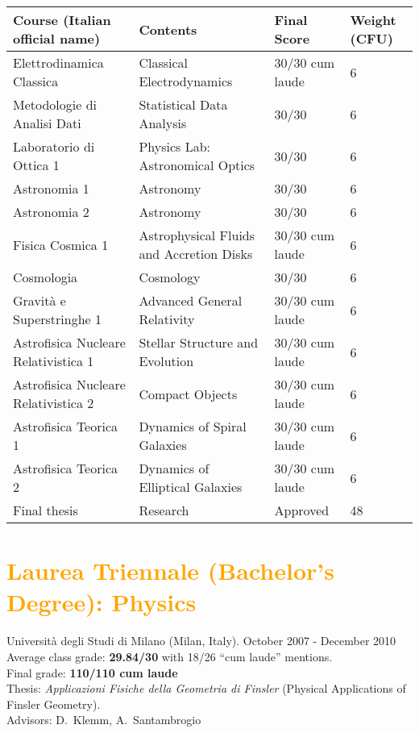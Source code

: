 \documentclass[a4paper,10pt,notitlepage]{paper}
\newcommand{\col}[1]{{\textcolor{Orange}{#1}}}
\begin{document}
{\begin{tabular*}{\linewidth}{l@{\hspace{0.65cm}}l@{\hspace{0.7cm}}l@{\hspace{0.7cm}}l@{\extracolsep{\fill}}}
\bf Course (Italian official name) & \bf Contents  & \bf Final Score &\bf Weight (CFU)\\
\hline \hline
Elettrodinamica Classica  					&  Classical Electrodynamics	 & 30/30 cum laude &   6 \\	
Metodologie di Analisi Dati				&  Statistical Data Analysis	&  30/30 &   6 \\
Laboratorio di Ottica 1					&  Physics Lab: Astronomical Optics & 30/30 &   6\\	
Astronomia 1 							&  Astronomy &  30/30&   6\\	
Astronomia 2							&  Astronomy &30/30 &   6 \\	
Fisica Cosmica	1						&  Astrophysical Fluids and Accretion Disks & 30/30 cum laude &   6\\	
Cosmologia  							&  Cosmology & 30/30&   6 \\	
Gravità e Superstringhe 1 					&  Advanced General Relativity & 30/30 cum laude &   6\\	
Astrofisica Nucleare Relativistica 1			&  Stellar Structure and Evolution & 30/30 cum laude&   6\\	
Astrofisica Nucleare Relativistica 2			&  Compact Objects  & 30/30 cum laude&   6\\
Astrofisica Teorica 1						&  Dynamics of Spiral Galaxies & 30/30 cum laude&   6\\	
Astrofisica Teorica 2						&  Dynamics of Elliptical Galaxies & 30/30 cum laude &   6\\
Final thesis						& Research  & Approved &  48\\
\end{tabular*}
}




\section*{\col{Laurea Triennale (Bachelor's Degree): Physics}}
Università degli Studi di Milano (Milan, Italy). October 2007 - December 2010\\
Average class grade: \textbf{29.84/30} with 18/26  ``cum laude'' mentions.\\
Final grade: \textbf{110/110 cum laude} \\
{Thesis}: {\it Applicazioni Fisiche della Geometria di Finsler} (Physical Applications of Finsler Geometry).\\
Advisors: D.~Klemm,  A.~Santambrogio\\
\end{document}
